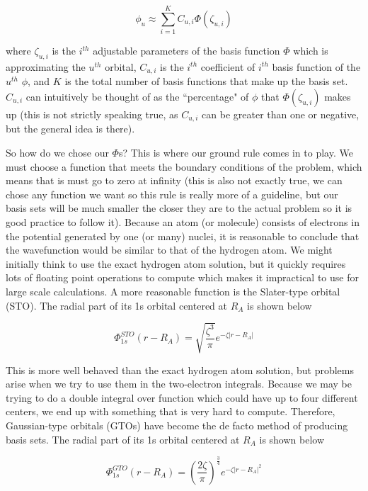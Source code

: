 \begin{equation}
\label{eq:linear_comb_bs}
\phi_{u} \approx \sum^{K}_{i=1}C_{u,i}\Phi(\zeta_{u,i})
\end{equation}

where $\zeta_{u,i}$ is the $i^{th}$ adjustable parameters of the basis function $\Phi$ which is approximating the $u^{th}$ orbital, $C_{u,i}$ is the $i^{th}$ coefficient of $i^{th}$ basis function of the $u^{th}$ $\phi$, and $K$ is the total number of basis functions that make up the basis set. $C_{u,i}$ can intuitively be thought of as the ``percentage" of $\phi$ that $\Phi(\zeta_{u,i})$ makes up (this is not strictly speaking true, as $C_{u,i}$ can be greater than one or negative, but the general idea is there).

So how do we chose our $\Phi$s? This is where our ground rule comes in to play. We must choose a function that meets the boundary conditions of the problem, which means that is must go to zero at infinity (this is also not exactly true, we can chose any function we want so this rule is really more of a guideline, but our basis sets will be much smaller the closer they are to the actual problem so it is good practice to follow it). Because an atom (or molecule) consists of electrons in the potential generated by one (or many) nuclei, it is reasonable to conclude that the wavefunction would be similar to that of the hydrogen atom. We might initially think to use the exact hydrogen atom solution, but it quickly requires lots of floating point operations to compute which makes it impractical to use for large scale calculations. A more reasonable function is the Slater-type orbital (STO)\cite{PhysRev.36.57}. The radial part of its 1s orbital centered at $R_{A}$ is shown below

\begin{equation}
\label{eq:sto_1s}
\Phi^{STO}_{1s}(r - R_{A}) = \sqrt{\frac{\zeta^{3}}{\pi}}e^{-\zeta|r- R_{A}|}
\end{equation}

This is more well behaved than the exact hydrogen atom solution, but problems arise when we try to use them in the two-electron integrals. Because we may be trying to do a double integral over function which could have up to four different centers, we end up with something that is very hard to compute. Therefore, Gaussian-type orbitals (GTOs) have become the de facto method of producing basis sets. The radial part of its 1s orbital centered at $R_{A}$ is shown below\cite{Boys542}

\begin{equation}
\label{eq:gto_1s}
\Phi^{GTO}_{1s}(r - R_{A}) = \left(\frac{2\zeta}{\pi}\right)^{\frac{3}{4}}e^{-\zeta|r- R_{A}|^{2}}
\end{equation}

